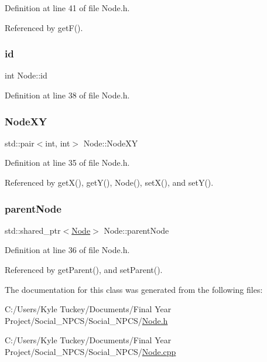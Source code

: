 Definition at line 41 of file Node.\+h.



Referenced by get\+F().

\mbox{\label{class_node_a59a543130a10c95f1e8642cf8c5645e8}} 
\subsubsection{\texorpdfstring{id}{id}}
{\footnotesize\ttfamily int Node\+::id\hspace{0.3cm}{\ttfamily [private]}}



Definition at line 38 of file Node.\+h.

\mbox{\label{class_node_ac85b927d8c9cdc484f169129d317f6f0}} 
\subsubsection{\texorpdfstring{Node\+XY}{NodeXY}}
{\footnotesize\ttfamily std\+::pair$<$int, int$>$ Node\+::\+Node\+XY\hspace{0.3cm}{\ttfamily [private]}}



Definition at line 35 of file Node.\+h.



Referenced by get\+X(), get\+Y(), Node(), set\+X(), and set\+Y().

\mbox{\label{class_node_aface6c6a7d38a7cc94090ef35bf9e95a}} 
\subsubsection{\texorpdfstring{parent\+Node}{parentNode}}
{\footnotesize\ttfamily std\+::shared\+\_\+ptr$<$\hyperlink{class_node}{Node}$>$ Node\+::parent\+Node\hspace{0.3cm}{\ttfamily [private]}}



Definition at line 36 of file Node.\+h.



Referenced by get\+Parent(), and set\+Parent().



The documentation for this class was generated from the following files\+:\begin{DoxyCompactItemize}
\item 
C\+:/\+Users/\+Kyle Tuckey/\+Documents/\+Final Year Project/\+Social\+\_\+\+N\+P\+C\+S/\+Social\+\_\+\+N\+P\+C\+S/\hyperlink{_node_8h}{Node.\+h}\item 
C\+:/\+Users/\+Kyle Tuckey/\+Documents/\+Final Year Project/\+Social\+\_\+\+N\+P\+C\+S/\+Social\+\_\+\+N\+P\+C\+S/\hyperlink{_node_8cpp}{Node.\+cpp}\end{DoxyCompactItemize}
